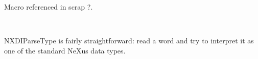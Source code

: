 \documentclass[12pt]{article}
\begin{document}
\begin{flushleft}
\begin{minipage}{\linewidth}
\begin{list}{}{}
\mbox{}\verb@          }@\\
\mbox{}\verb@       }@\\
\mbox{}\verb@       return NX_OK;@\\
\mbox{}\verb@   }@\\
\mbox{}\verb@@$\diamond$
\end{list}
\vspace{-1ex}
\footnotesize\addtolength{\baselineskip}{-1ex}
\begin{list}{}{\setlength{\itemsep}{-\parsep}\setlength{\itemindent}{-\leftmargin}}
\item Macro referenced in scrap ?.
\end{list}
\end{minipage}\\[4ex]
\end{flushleft}
NXDIParseType is fairly straightforward: read a word and try to interpret it 
as one of the standard NeXus data types.
\end{document}
